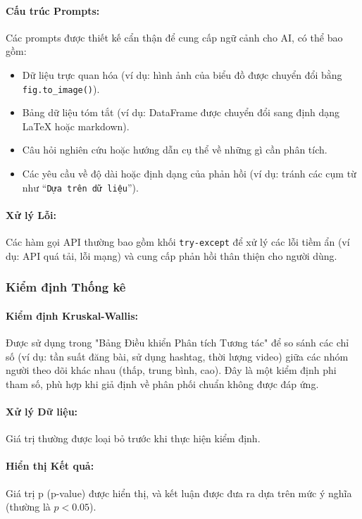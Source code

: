 \paragraph{Cấu trúc Prompts:} Các prompts được thiết kế cẩn thận để cung cấp ngữ cảnh cho AI, có thể bao gồm:
\begin{itemize}
    \item Dữ liệu trực quan hóa (ví dụ: hình ảnh của biểu đồ được chuyển đổi bằng \texttt{fig.to\_image()}).

    \item Bảng dữ liệu tóm tắt (ví dụ: DataFrame được chuyển đổi sang định dạng LaTeX hoặc markdown).
    
    \item Câu hỏi nghiên cứu hoặc hướng dẫn cụ thể về những gì cần phân tích.
    
    \item Các yêu cầu về độ dài hoặc định dạng của phản hồi (ví dụ: tránh các cụm từ như ``\texttt{Dựa trên dữ liệu}'').
\end{itemize}

\paragraph{Xử lý Lỗi:} Các hàm gọi API thường bao gồm khối \texttt{try-except} để xử lý các lỗi tiềm ẩn (ví dụ: API quá tải, lỗi mạng) và cung cấp phản hồi thân thiện cho người dùng.


\subsubsection{Kiểm định Thống kê}

\paragraph{Kiểm định Kruskal-Wallis:} Được sử dụng trong "Bảng Điều khiển Phân tích Tương tác" để so sánh các chỉ số (ví dụ: tần suất đăng bài, sử dụng hashtag, thời lượng video) giữa các nhóm người theo dõi khác nhau (thấp, trung bình, cao). Đây là một kiểm định phi tham số, phù hợp khi giả định về phân phối chuẩn không được đáp ứng.

\paragraph{Xử lý Dữ liệu:} Giá trị  thường được loại bỏ trước khi thực hiện kiểm định.

\paragraph{Hiển thị Kết quả:} Giá trị p (p-value) được hiển thị, và kết luận được đưa ra dựa trên mức ý nghĩa (thường là $p < 0.05$).


